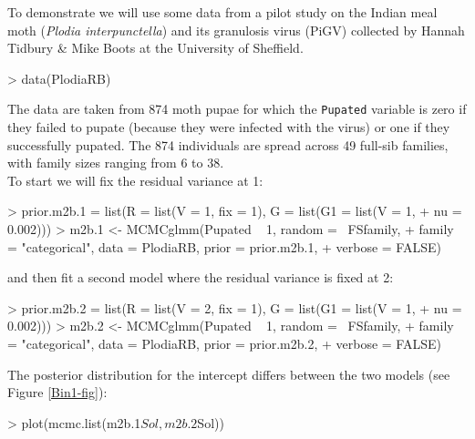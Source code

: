\documentclass{article}
\begin{document}
To demonstrate we will use some data from a pilot study on the Indian meal moth (\emph{Plodia interpunctella}) and its granulosis virus (PiGV) collected by Hannah Tidbury \& Mike Boots at the University of Sheffield.

\begin{Schunk}
\begin{Sinput}
> data(PlodiaRB)
\end{Sinput}
\end{Schunk}

The data are taken from  874 moth pupae for which the \texttt{Pupated} variable is zero if they failed to pupate (because they were infected with the virus) or one if they successfully pupated. The 874 individuals are spread across 49 full-sib families, with family sizes ranging from 6 to 38.\\

To start we will fix the residual variance at 1:

\begin{Schunk}
\begin{Sinput}
> prior.m2b.1 = list(R = list(V = 1, fix = 1), G = list(G1 = list(V = 1, 
+     nu = 0.002)))
> m2b.1 <- MCMCglmm(Pupated ~ 1, random = ~FSfamily, 
+     family = "categorical", data = PlodiaRB, prior = prior.m2b.1, 
+     verbose = FALSE)
\end{Sinput}
\end{Schunk}

and then fit a second model where the residual variance is fixed at 2:

\begin{Schunk}
\begin{Sinput}
> prior.m2b.2 = list(R = list(V = 2, fix = 1), G = list(G1 = list(V = 1, 
+     nu = 0.002)))
> m2b.2 <- MCMCglmm(Pupated ~ 1, random = ~FSfamily, 
+     family = "categorical", data = PlodiaRB, prior = prior.m2b.2, 
+     verbose = FALSE)
\end{Sinput}
\end{Schunk}

The posterior distribution for the intercept differs between the two models (see Figure \ref{Bin1-fig}): 

\begin{Schunk}
\begin{Sinput}
> plot(mcmc.list(m2b.1$Sol, m2b.2$Sol))
\end{Sinput}
\end{Schunk}
\end{document}
